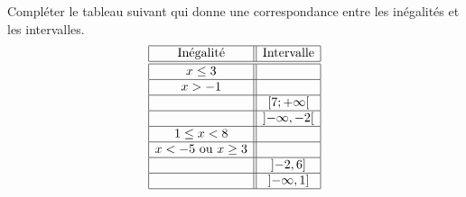 
\begin{exercice}\label{exosmath-0322}

    Compléter le tableau suivant qui donne une correspondance entre les inégalités et les intervalles.
    \begin{equation*}
        \begin{array}[]{|c||c|}
            \hline
            \text{Inégalité}&\text{Intervalle}\\
            \hline\hline
            x\leq 3&\\
            \hline
            x>-1&\\
            \hline
            &\mathopen[ 7 ; +\infty [\\
            \hline
            &\mathopen] -\infty , -2 \mathclose[\\
            \hline
            1\leq x<8&\\
            \hline
            x<-5\text{ ou }x\geq 3&\\
            \hline
            &\mathopen] -2 , 6 \mathclose]\\
            \hline
            &\mathopen] -\infty , 1 \mathclose]\\
            \hline
        \end{array}
    \end{equation*}

\end{exercice}

